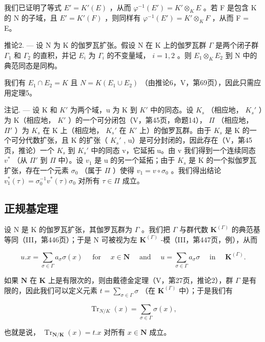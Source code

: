 我们已证明了等式 \(E' = K'(E)\) ，从而 \(\varphi^{-1}(E') = K' \otimes_{K} E\) 。若 F 是包含 K 的 N 的子域，且 \(E' = K'(F)\) ，则同样有 \(\varphi^{-1}(E') = K' \otimes_{K} F\) ，从而 F = E。

推论2. --- 设 N 为 K 的伽罗瓦扩张。假设 N 在 K 上的伽罗瓦群 \(\Gamma\) 是两个闭子群 \(\Gamma_1\) 和 \(\Gamma_2\) 的直积，并记 \(E_i\) 为 \(\Gamma_i\) 的不变量域， \(i = 1, 2\) 。则 \(E_1 \otimes_K E_2\) 到 N 中的典范同态是同构。

我们有 \(E_{1} \cap E_{2} = K\) 且 \(N = K(E_{1} \cup E_{2})\) （由推论6，V，第69页），因此只需应用定理5。

注记. --- 设 K 和 \(K'\) 为两个域，u 为 K 到 \(K'\) 中的同态。设 \(K_s\) （相应地， \(K_s'\) ）为 K（相应地， \(K'\) ）的一个可分闭包（V，第45页，命题14）， \(\Pi\) （相应地， \(\Pi'\) ）为 \(K_s\) 在 K 上（相应地， \(K_s'\) 在 \(K'\) 上）的伽罗瓦群。由于 \(K_s\) 是 K 的一个可分代数扩张，且 K 的扩张（ \(K_s'\) , u）是可分封闭的，因此存在（V，第45页，推论）一个 \(K_s\) 到 \(K_s'\) 中的同态 v，它延拓 u。由 v 我们得到一个连续同态 \(v^*\) （从 \(\Pi'\) 到 \(\Pi\) 中）。设 \(v_1\) 是 u 的另一个延拓；由于 \(K_s\) 是 K 的一个拟伽罗瓦扩张，存在一个元素 \(\sigma_0\) （属于 \(\Pi\) ）使得 \(v_1 = v \circ \sigma_0\) 。我们得出结论 \(v_1^*(\tau) = \sigma_0^{-1} v^*(\tau) \sigma_0\) 对所有 \(\tau \in \Pi\) 成立。

\subsection{正规基定理}

设 N 是 K 的伽罗瓦扩张，其伽罗瓦群为 \(\Gamma\) 。我们把 \(\Gamma\) 与群代数 \(\mathbf{K}^{(\Gamma)}\) 的典范基等同（III，第446页）；于是 N 可被视为左 \(\mathbf{K}^{(\Gamma)}\) -模（III，第447页，例），从而

\[
u. x = \sum_ {\sigma \in \Gamma} a _ {\sigma} \sigma (x) \quad \text { for } \quad x \in \mathbf {N} \quad \text { and } \quad u = \sum_ {\sigma \in \Gamma} a _ {\sigma} \sigma \quad \text { in } \quad \mathbf {K} ^ {(\Gamma)}.
\]

如果 \(\mathbf{N}\) 在 \(\mathbf{K}\) 上是有限次的，则由戴德金定理（V，第27页，推论2），群 \(\Gamma\) 是有限的，因此我们可以定义元素 \(t = \sum_{\sigma \in \Gamma} \sigma\) （在 \(\mathbf{K}^{(\Gamma)}\) 中）；于是我们有

\[
\operatorname{Tr} _ {N / K} (x) = \sum_ {\sigma \in \Gamma} \sigma (x),
\]

也就是说， \(\operatorname{Tr}_{\mathbf{N} / \mathbf{K}}(x) = t.x\) 对所有 \(x \in \mathbf{N}\) 成立。

